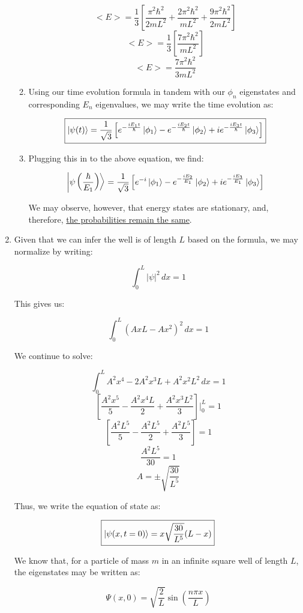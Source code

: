 \begin{enumerate}
\begin{enumerate}
        $$<E>=\frac{1}{3}\left[ \frac{\pi^2\hbar^2}{2mL^2}+\frac{2\pi^2\hbar^2}{mL^2}+\frac{9\pi^2\hbar^2}{2mL^2} \right]$$
        $$<E>=\frac{1}{3}\left[ \frac{7\pi^2\hbar^2}{mL^2} \right]$$
        $$\boxed{<E>=\frac{7\pi^2\hbar^2}{3mL^2} }$$

      \item Using our time evolution formula in tandem with our $\phi_n$ eigenstates and corresponding $E_n$ eigenvalues, we may write the time evolution as:

        $$\boxed{\ket{\psi(t)}=\frac{1}{\sqrt{3}}\left[e^{-\frac{iE_1t}{\hbar}}\ket{\phi_1}-e^{-\frac{iE_2t}{\hbar}}\ket{\phi_2}+ie^{-\frac{iE_3t}{\hbar}}\ket{\phi_3}\right]}$$

      \item Plugging this in to the above equation, we find:

        $$\ket{\psi\left( \frac{\hbar}{E_1} \right)}=\frac{1}{\sqrt{3}}\left[e^{-i}\ket{\phi_1}-e^{-\frac{iE_2}{E_1}}\ket{\phi_2}+ie^{-\frac{iE_3}{E_1}}\ket{\phi_3}\right]$$

        We may observe, however, that energy states are stationary, and, therefore, \underline{the probabilities remain the same}.

    \end{enumerate}

  \item Given that we can infer the well is of length $L$ based on the formula, we may normalize by writing:

    $$\int_0^L |\psi|^2\,dx=1$$

    This gives us:

    $$\int_0^L (AxL-Ax^2)^2\,dx=1$$

    We continue to solve:

    $$\int_0^L A^2x^4-2A^2x^3L+A^2x^2L^2\,dx=1$$
    $$\left[\frac{A^2x^5}{5}-\frac{A^2x^4L}{2}+\frac{A^2x^3L^2}{3}\right]\Big|_0^L=1$$
    $$\left[\frac{A^2L^5}{5}-\frac{A^2L^5}{2}+\frac{A^2L^5}{3}\right]=1$$
    $$\frac{A^2L^5}{30}=1$$
    $$\boxed{A=\pm\sqrt{\frac{30}{L^5}}}$$

    Thus, we write the equation of state as:

    $$\boxed{\ket{\psi(x,t=0)}=x\sqrt{\frac{30}{L^5}}(L-x)}$$

    We know that, for a particle of mass $m$ in an infinite square well of length $L$, the eigenstates may be written as:

    $$\Psi(x,0)=\sqrt{\frac{2}{L}}\sin\left( \frac{n\pi x}{L} \right)$$


\end{enumerate}
